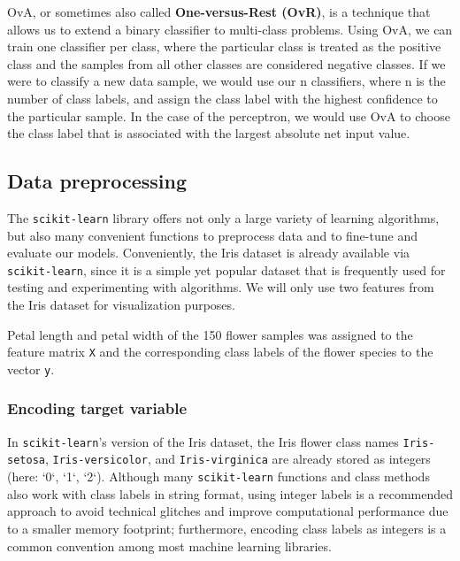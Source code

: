 \documentclass[11pt]{article}
\begin{document}
    OvA, or sometimes also called \textbf{One-versus-Rest (OvR)}, is a technique that allows us to extend a binary classifier to multi-class problems.
    Using OvA, we can train one classifier per class, where the particular class is treated as the positive class and the samples from all other classes are considered negative classes.
    If we were to classify a new data sample, we would use our n classifiers, where n is the number of class labels, and assign the class label with the highest confidence to the particular sample.
    In the case of the perceptron, we would use OvA to choose the class label that is associated with the largest absolute net input value.

    \subsection{Data preprocessing} \label{subsec:perc_preproc}

    The \texttt{scikit-learn} library offers not only a large variety of learning algorithms, but also many convenient functions to preprocess data and to fine-tune and evaluate our models.
    Conveniently, the Iris dataset is already available via \texttt{scikit-learn}, since it is a simple yet popular dataset that is frequently used for testing and experimenting with algorithms.
    We will only use two features from the Iris dataset for visualization purposes.

    Petal length and petal width of the 150 flower samples was assigned to the feature matrix \texttt{X} and the corresponding class labels of the flower species to the vector \texttt{y}.

    \subsubsection{Encoding target variable} \label{subsec:preproc_encode_target}

    In \texttt{scikit-learn}'s version of the Iris dataset, the Iris flower class names \texttt{Iris-setosa}, \texttt{Iris-versicolor}, and \texttt{Iris-virginica} are already stored as integers (here: `0`, `1`, `2`).
    Although many \texttt{scikit-learn} functions and class methods also work with class labels in string format, using integer labels is a recommended approach to avoid technical glitches and improve computational performance due to a smaller memory footprint;
    furthermore, encoding class labels as integers is a common convention among most machine learning libraries.
\end{document}
